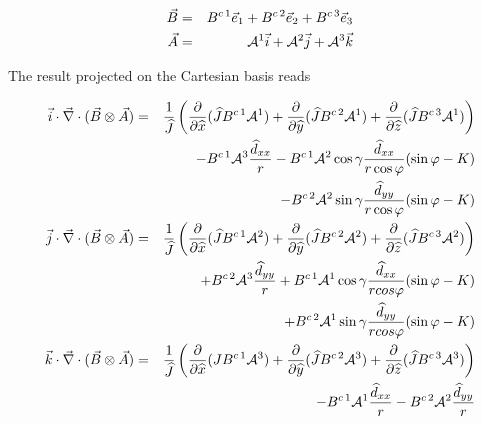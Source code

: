 \begin{eqnarray}
\vec{B} &=& B^{c \, 1}\vec{e} _{1} +
B^{c \, 2}\vec{e} _{2} +B^{c \, 3}\vec{e} _{3}\nonumber \\
\vec{A} &=& {\cal A}^{1} \vec{i} +
{\cal A}^{2}\vec{j}+{\cal A}^{3} \vec{k} \nonumber
\end{eqnarray}

The result projected on the Cartesian basis reads

\begin{eqnarray}
\vec{i} \cdot \vec{\nabla}\cdot (\vec{B} \otimes \vec{A}) & = &
\dfrac{1}{\widehat{J}}\left(\dfrac{\partial}{\partial \widehat{x}}(\widehat{J}
B^{c \, 1} {\cal A}^{1})
+ \dfrac{\partial}{\partial \widehat{y}}(\widehat{J} B^{c \, 2} {\cal A}^{1})
+ \dfrac{\partial}{\partial \widehat{z}}(\widehat{J} B^{c \, 3}{\cal A}^{1})\right)
\nonumber \\
& &  -  B^{c \, 1} {\cal A}^{3}\dfrac{\widehat{d}_{xx}}{r}
 - B^{c \,1 } {\cal A}^{2} \cos \gamma \dfrac{\widehat{d}_{xx}}{r \cos\varphi}
 (\sin\varphi - K) \nonumber \\
& & -  B^{c \, 2}{\cal A}^{2} \sin \gamma \dfrac{\widehat{d}_{yy}}{r \cos\varphi}
 (\sin\varphi - K)
 \nonumber \\
\vec{j} \cdot \vec{\nabla}\cdot (\vec{B} \otimes \vec{A}) & = &
\dfrac{1}{\widehat{J}}\left(\dfrac{\partial}{\partial \widehat{x}}(\widehat{J}
B^{c \, 1} {\cal A}^{2})
+ \dfrac{\partial}{\partial \widehat{y}}(\widehat{J} B^{c \, 2}{\cal A}^{2})
 + \dfrac{\partial}{\partial \widehat{z}}(\widehat{J} B^{c\, 3}{\cal A}^{2})\right)
\nonumber \\
 & &  +  B^{c \, 2}{\cal A}^{3}\dfrac{\widehat{d}_{yy}}{r}
  +  B^{c \, 1}{\cal A}^{1} \cos \gamma \dfrac{\widehat{d}_{xx}}{r cos\varphi}
  (\sin\varphi - K) \nonumber \\
& &  +  B^{c \, 2}{\cal A}^{1} \sin \gamma \dfrac{\widehat{d}_{yy}}{r cos\varphi}
  (\sin\varphi - K)
  \nonumber \\
\vec{k} \cdot \vec{\nabla}\cdot (\vec{B} \otimes \vec{A}) & = &
\dfrac{1}{\widehat{J}}\left(\dfrac{\partial}{\partial \widehat{x}}(J B^{c \, 1}{\cal
A}^{3})
+ \dfrac{\partial}{\partial \widehat{y}}(\widehat{J} B^{c \, 2}{\cal A}^{3})
 + \dfrac{\partial}{\partial \widehat{z}}(\widehat{J} B^{c \, 3}{\cal A}^{3})\right)
 \nonumber \\
 & &  -  B^{c \, 1}{\cal A}^{1} \dfrac{\widehat{d}_{xx}}{r}
   -  B^{c \, 2}{\cal A}^{2}  \dfrac{\widehat{d}_{yy}}{r}
\end{eqnarray}

